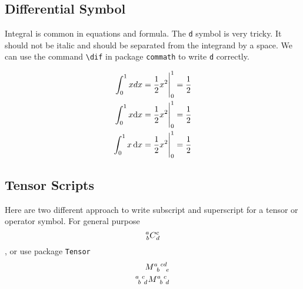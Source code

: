 \subsection{Differential Symbol}

Integral is common in equations and formula. The \verb|d| symbol is very tricky. It should not be italic and should be separated from the integrand by a space. We can use the command \verb|\dif| in package \verb|commath| to write \verb|d| correctly.

\begin{eqnarray}
    \int_0^1 x dx = \frac{1}{2}x^2 \Bigg|_0^1 = \frac{1}{2}\\
    \int_0^1 x \mathrm{d}x = \frac{1}{2}x^2 \Bigg|_0^1 = \frac{1}{2}\\
    \int_0^1 x \dif x = \frac{1}{2}x^2 \Bigg|_0^1 = \frac{1}{2}
\end{eqnarray}

\subsection{Tensor Scripts}

Here are two different approach to write subscript and superscript for a tensor or operator symbol. For general purpose
\begin{equation}
    \prescript{a}{b}{C}_{d}^{c}
\end{equation}
, or use package \verb|Tensor|
\begin{eqnarray}
    M\indices{^a_b^{cd}_e}\\
    \tensor[^a_b^c_d]{M}{^a_b^c_d}
\end{eqnarray}
